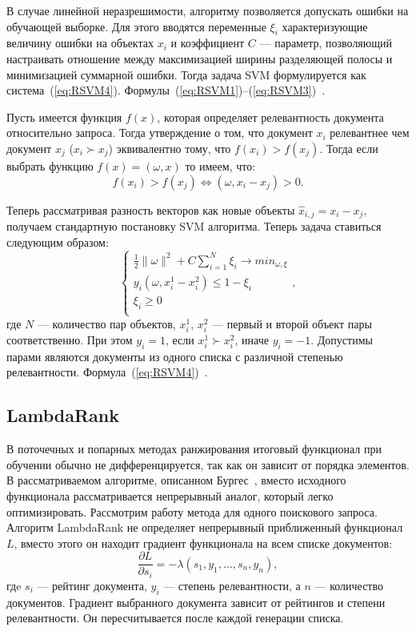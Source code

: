 В случае линейной неразрешимости, алгоритму позволяется допускать ошибки на обучающей выборке. Для этого вводятся переменные $\xi_{i}$ характеризующие величину ошибки на объектах $x_i$ и коэффициент $C$ --- параметр, позволяющий настраивать отношение между максимизацией ширины разделяющей полосы и минимизацией суммарной ошибки. Тогда задача SVM формулируется как система~(\ref{eq:RSVM4}). Формулы~(\ref{eq:RSVM1})--(\ref{eq:RSVM3})~\cite{ML_no_wors}.

Пусть имеется функция $f(x)$, которая определяет релевантность документа относительно запроса. Тогда утверждение о том, что документ $x_{i}$ релевантнее чем документ $x_{j}$  ($x_{i} \succ x_{j}$)  эквивалентно тому, что $f(x_{i}) > f(x_{j})$. Тогда если выбрать функцию $f(x)=(\omega, x)$ то имеем, что:
\[
	f(x_{i}) > f(x_{j}) \iff (\omega, x_{i} - x_{j}) > 0.
\]

Теперь рассматривая разность векторов как новые объекты $\hat{x}_{i, j} = x_{i} - x_{j}$, получаем стандартную постановку SVM алгоритма. Теперь задача ставиться следующим образом:
\begin{equation}
\begin{cases}
	\label{eq:RSVM4}
	\frac{1}{2}\| \omega \|^2+C  \displaystyle\sum_{i=1}^{N} \xi_{i}\to min_{\omega, \xi} \\
	y_{i}(\omega, x_{i}^1 - x_{i}^2) \leq 1 - \xi_{i} \\
	\xi_{i} \geq 0 \\
\end{cases},
\end{equation}
где $N$ --- количество пар объектов, $x_{i}^1$, $x_{i}^2$ --- первый и второй объект пары соответственно. При этом $y_{i} = 1$, если $x_{i}^1 \succ x_{i}^2$, иначе  $y_{i} = -1$. Допустимы парами являются документы из одного списка  с различной степенью релевантности. Формула~(\ref{eq:RSVM4})~\cite{RankSVM}.

\subsection{LambdaRank}

В поточечных и попарных методах ранжирования итоговый функционал при обучении обычно не дифференцируется, так как он зависит от порядка элементов. В рассматриваемом алгоритме, описанном Бургес~\cite{LamdaRank}, вместо исходного функционала рассматривается непрерывный аналог, который легко оптимизировать.
Рассмотрим работу метода для одного поискового запроса. Алгоритм LambdaRank не определяет непрерывный приближенный функционал $L$, вместо этого он находит градиент функционала на всем списке документов:
\begin{equation}
	\label{eq:LBR1}
	\frac{\partial L}{\partial s_{i}} = -\lambda(s_{1}, y_{1}, \dots, s_{n}, y_{n}),
\end{equation}
гдe $s_{i}$ --- рейтинг документа, $y_{i}$ --- степень релевантности, а $n$ --- количество документов. Градиент выбранного документа зависит от рейтингов и степени релевантности. Он пересчитывается после каждой генерации списка.

